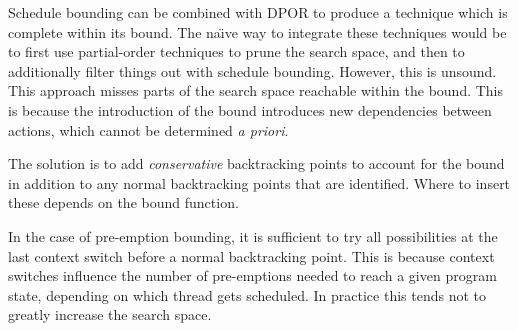 Schedule bounding can be combined with DPOR to produce a technique which is
complete within its bound.  The na\"{\i}ve way to integrate these techniques
would be to first use partial-order techniques to prune the search space, and
then to additionally filter things out with schedule bounding.  However, this is
unsound.  This approach misses parts of the search space reachable within the
bound.  This is because the introduction of the bound introduces new
dependencies between actions, which cannot be determined \emph{a
  priori}\cite{coons2013}.

The solution is to add \emph{conservative} backtracking points to account for
the bound in addition to any normal backtracking points that are identified.
Where to insert these depends on the bound function.

In the case of pre-emption bounding, it is sufficient to try all possibilities
at the last context switch before a normal backtracking point\cite{coons2013}.
This is because context switches influence the number of pre-emptions needed to
reach a given program state, depending on which thread gets scheduled.  In
practice this tends not to greatly increase the search space.
